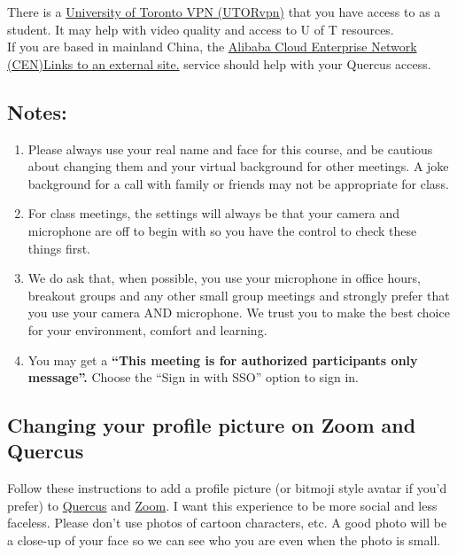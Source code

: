 \documentclass[
  openany]{book}
\begin{document}
There is a \href{https://isea.utoronto.ca/services/vpn/utorvpn/}{University of Toronto VPN (UTORvpn)} that you have access to as a student. It may help with video quality and access to U of T resources.\\
If you are based in mainland China, the \href{https://onesearch.library.utoronto.ca/ic-faq-categories/alibaba-cloud-enterprise-network-cen-service}{Alibaba Cloud Enterprise Network (CEN)Links to an external site.} service should help with your Quercus access.

\hypertarget{notes}{%
\subsection{Notes:}\label{notes}}

\begin{enumerate}
\def\labelenumi{\arabic{enumi}.}
\item
  Please always use your real name and face for this course, and be cautious about changing them and your virtual background for other meetings. A joke background for a call with family or friends may not be appropriate for class.
\item
  For class meetings, the settings will always be that your camera and microphone are off to begin with so you have the control to check these things first.
\item
  We do ask that, when possible, you use your microphone in office hours, breakout groups and any other small group meetings and strongly prefer that you use your camera AND microphone. We trust you to make the best choice for your environment, comfort and learning.
\item
  You may get a \textbf{``This meeting is for authorized participants only message''.} Choose the ``Sign in with SSO'' option to sign in.
\end{enumerate}

\hypertarget{changing-your-profile-picture-on-zoom-and-quercus}{%
\subsection{Changing your profile picture on Zoom and Quercus}\label{changing-your-profile-picture-on-zoom-and-quercus}}

Follow these instructions to add a profile picture (or bitmoji style avatar if you'd prefer) to \href{https://community.canvaslms.com/docs/DOC-10599-4212710334}{Quercus} and \href{https://support.zoom.us/hc/en-us/articles/201363203-Customizing-your-profile}{Zoom}. I want this experience to be more social and less faceless. Please don't use photos of cartoon characters, etc. A good photo will be a close-up of your face so we can see who you are even when the photo is small.
\end{document}
